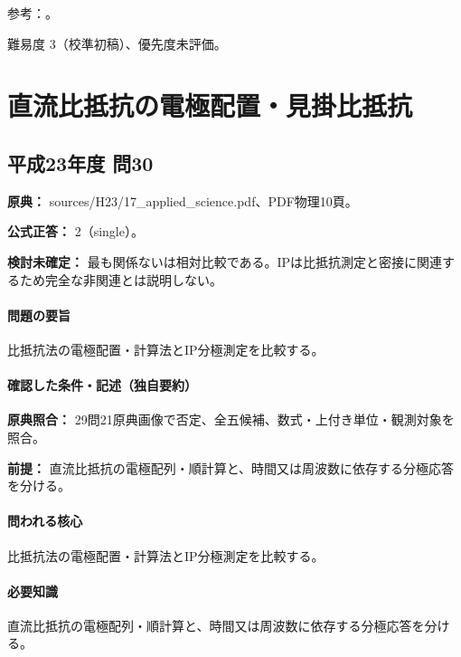 \par 参考：\cite{epa_borehole_resistivity,epa_gamma_density,geebec_ps,oyo_suspension}。

\par 難易度 3（校準初稿）、優先度未評価。

\section{直流比抵抗の電極配置・見掛比抵抗}

\subsection{平成23年度 問30}
\label{q:h23-reg-applied-30}

\noindent\textbf{原典：} sources/H23/17\_applied\_science.pdf、PDF物理10頁。

\textbf{公式正答：} 2（single）。

\par\textbf{検討未確定：} 最も関係ないは相対比較である。IPは比抵抗測定と密接に関連するため完全な非関連とは説明しない。

\paragraph{問題の要旨} 比抵抗法の電極配置・計算法とIP分極測定を比較する。

\paragraph{確認した条件・記述（独自要約）}\mbox{}\par

\noindent\textbf{原典照合：} 29問21原典画像で否定、全五候補、数式・上付き単位・観測対象を照合。\par

\noindent\textbf{前提：} 直流比抵抗の電極配列・順計算と、時間又は周波数に依存する分極応答を分ける。\par

\paragraph{問われる核心} 比抵抗法の電極配置・計算法とIP分極測定を比較する。

\paragraph{必要知識} 直流比抵抗の電極配列・順計算と、時間又は周波数に依存する分極応答を分ける。

